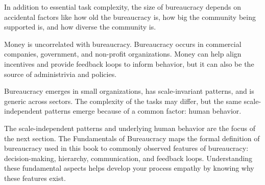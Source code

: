 In addition to essential task complexity, the size of bureaucracy depends on accidental factors like how old the bureaucracy is, how big the community being supported is, and how diverse the community is.

Money is uncorrelated with bureaucracy. Bureaucracy occurs in commercial companies, government, and non-profit organizations. Money can help align incentives and provide feedback loops to inform behavior, but it can also be the source of administrivia and policies. 

Bureaucracy emerges in small organizations, has scale-invariant patterns, and is generic across sectors. The complexity of the tasks may differ, but the same scale-independent patterns emerge because of a common factor: human behavior. 

The scale-independent patterns and underlying human behavior are the focus of the next section. The Fundamentals of Bureaucracy maps the formal definition of bureaucracy used in this book to commonly observed features of bureaucracy: decision-making, hierarchy, communication, and feedback loops. Understanding these fundamental aspects helps develop your process empathy by knowing why these features exist. 

